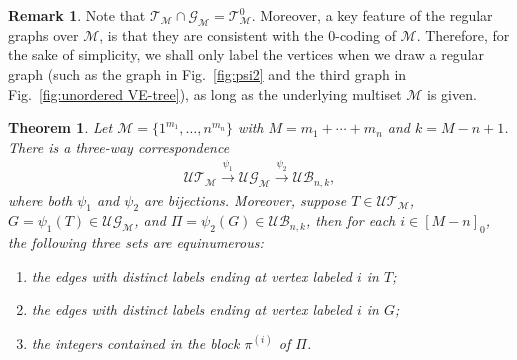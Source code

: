 \documentclass[11pt,reqno]{amsart}
\numberwithin{equation}{section}
\theoremstyle{plain}
\newtheorem{theorem}{Theorem}[section]
\theoremstyle{definition}
\newtheorem{remark}{Remark}
\newcommand{\M}{\mathcal{M}}
\newcommand{\T}{\mathcal{T}}
\newcommand{\G}{\mathcal{G}}
\newcommand{\UT}{\mathcal{UT}}
\newcommand{\UB}{\mathcal{UB}}
\newcommand{\UG}{\mathcal{UG}}
\begin{document}
\begin{remark}
Note that $\T_{\M}\cap\G_{\M}=\T_{\M}^0$. Moreover, a key feature of the regular graphs over $\M$, is that they are consistent with the $0$-coding of $\M$. Therefore, for the sake of simplicity, we shall only label the vertices when we draw a regular graph (such as the graph in Fig.~\ref{fig:psi2} and the third graph in Fig.~\ref{fig:unordered VE-tree}), as long as the underlying multiset $\M$ is given.
\end{remark}

\begin{theorem}\label{thm:unorder}
Let $\M=\{1^{m_1},\ldots,n^{m_n}\}$ with $M=m_1+\cdots+m_n$ and $k=M-n+1$. There is a three-way correspondence
\begin{align}
\UT_{\M}\stackrel{\psi_1}{\longrightarrow}\UG_{\M}\stackrel{\psi_2}{\longrightarrow}\UB_{n,k},
\end{align}
where both $\psi_1$ and $\psi_2$ are bijections. Moreover, suppose $T\in\UT_{\M}$, $G=\psi_1(T)\in\UG_{\M}$, and $\Pi=\psi_2(G)\in\UB_{n,k}$, then for each $i\in[M-n]_0$, the following three sets are equinumerous:
\begin{enumerate}
	\item the edges with distinct labels ending at vertex labeled $i$ in $T$;
	\item the edges with distinct labels ending at vertex labeled $i$ in $G$;
	\item the integers contained in the block $\pi^{(i)}$ of $\Pi$.
\end{enumerate}
\end{theorem}
\end{document}
